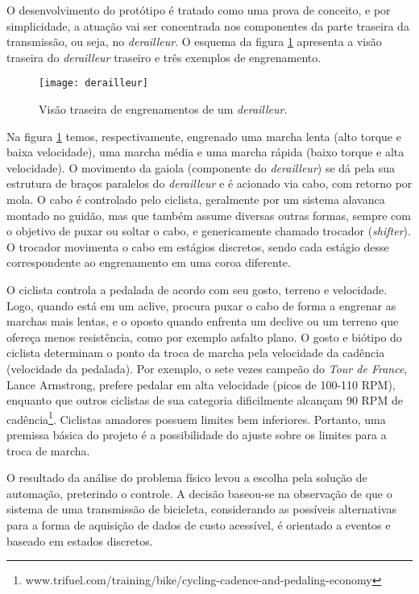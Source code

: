 \documentclass[a4paper,11pt]{article}
\begin{document}
O desenvolvimento do protótipo é tratado como uma prova de conceito, e por
simplicidade, a atuação vai ser concentrada nos componentes da parte traseira
da transmissão, ou seja, no \textit{derailleur}.
O esquema da figura \ref{fig:derailleur} apresenta a visão traseira
do \textit{derailleur} traseiro e três exemplos de engrenamento.
\begin{figure}[ht]
\begin{center}
 \texttt{[image: derailleur]}
\end{center}
  \caption{Visão traseira de engrenamentos de um \textit{derailleur}.}
  \label{fig:derailleur}
\end{figure}
Na figura \ref{fig:derailleur} temos, respectivamente, engrenado uma marcha
lenta (alto torque e baixa velocidade), uma marcha média e uma marcha rápida
(baixo torque e alta velocidade). O movimento da gaiola (componente do
\textit{derailleur}) se dá pela sua estrutura de braços paralelos do
\textit{derailleur} e é acionado via cabo, com retorno por mola. O cabo é
controlado pelo ciclista, geralmente por um sistema alavanca montado no guidão,
mas que também assume diversas outras formas, sempre com o objetivo de puxar ou
soltar o cabo, e genericamente chamado trocador (\textit{shifter}). O
trocador movimenta o cabo em estágios discretos, sendo cada estágio desse
correspondente ao engrenamento em uma coroa diferente.

O ciclista controla a pedalada de acordo com seu gosto, terreno e
velocidade. Logo, quando está em um aclive, procura puxar o cabo de forma a
engrenar as marchas mais lentas, e o oposto quando enfrenta um declive ou um
terreno que ofereça menos resistência, como por exemplo asfalto plano. O gosto e
biótipo do ciclista determinam o ponto da troca de marcha pela velocidade da
cadência (velocidade da pedalada). Por exemplo, o sete vezes campeão do
\textit{Tour de France}, Lance Armstrong, prefere pedalar em alta velocidade
(picos de 100-110 RPM), enquanto que outros ciclistas de sua categoria
dificilmente alcançam 90 RPM de
cadência\footnote{
www.trifuel.com/training/bike/cycling-cadence-and-pedaling-economy}.
Ciclistas amadores possuem limites bem inferiores. Portanto, uma premissa básica
do projeto é a possibilidade do ajuste sobre os limites para a troca de marcha.

O resultado da análise do problema físico levou a escolha pela solução de
automação, preterindo o controle. A decisão baseou-se na observação de que o
sistema de uma transmissão de bicicleta, considerando as possíveis alternativas
para a forma de aquisição de dados de custo acessível, é orientado a
eventos e baseado em estados discretos.
\end{document}
